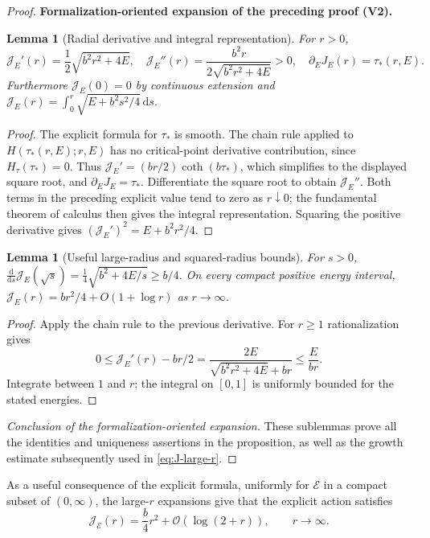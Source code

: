 \documentclass[11pt]{article}
\newtheorem{lemma}[theorem]{Lemma}
\newcommand{\formalisationparentid}{X}
\newenvironment{formalisationaddition}[1]{\par\medskip\begingroup\color{blue}\def\formalisationparentid{#1}\setcounter{formalizationsublemma}{0}\let\lemma\formalizationsublemma\let\endlemma\endformalizationsublemma
  \def\Eo{\mathcal E_h^\circ}\def\EE{\mathcal E_h}\def\phio{\phi_h^\circ}\def\phih{\phi_h}\def\Ho{H_h^{\rm atom}(v^\circ)}\def\Ha{H_h^{\rm atom}}\def\HL{H_h^{L}}\def\Dh{D_h}\def\Log{\operatorname{Log}}\def\ellh{\ell_h}\def\Gp{G_{p,h}}\def\Ast{A_{*,h}}\def\ahat{\widehat{\mathfrak a}_h}\def\ah{\mathfrak a_h}\def\rh{\widehat\rho_h}\def\deltah{\widehat\delta_h}\def\oldref##1{\textup{(##1)}}\def\interface##1{\par\noindent\textit{Analytical interface used here.} ##1\par}\def\finish{\par\noindent\textit{Conclusion of the formalization-oriented expansion.} }\par\noindent\textbf{Formalization-oriented expansion of the preceding proof (V2).}\par\smallskip
}{\par\endgroup\medskip
}
\newcommand{\cE}{\mathcal E}
\newcommand{\cJ}{\mathcal J}
\newcommand{\cO}{\mathcal O}
\begin{document}
\begin{proof}
\begin{formalisationaddition}{P2.2}
\begin{lemma}[Radial derivative and integral representation]\label{sublemma:P2-2-action-derivatives}
For $r>0$,
\[
 \cJ_E'(r)=\frac12\sqrt{b^2r^2+4E},\quad
 \cJ_E''(r)=\frac{b^2r}{2\sqrt{b^2r^2+4E}}>0,\quad
 \partial_EJ_E(r)=\tau_*(r,E).
\]
Furthermore $\cJ_E(0)=0$ by continuous extension and
$\cJ_E(r)=\int_0^r\sqrt{E+b^2s^2/4}\,\mathrm ds$.
\end{lemma}
\begin{proof}
The explicit formula for $\tau_*$ is smooth. The chain rule applied to $H(\tau_*(r,E);r,E)$ has no critical-point derivative contribution, since $H_\tau(\tau_*)=0$. Thus $\cJ_E'=(br/2)\coth(b\tau_*)$, which simplifies to the displayed square root, and $\partial_EJ_E=\tau_*$. Differentiate the square root to obtain $\cJ_E''$. Both terms in the preceding explicit value tend to zero as $r\downarrow0$; the fundamental theorem of calculus then gives the integral representation. Squaring the positive derivative gives $(\cJ_E')^2=E+b^2r^2/4$.
\end{proof}

\begin{lemma}[Useful large-radius and squared-radius bounds]\label{sublemma:P2-2-growth}
For $s>0$,
$\frac{\mathrm d}{\mathrm ds}\cJ_E(\sqrt s)=\frac14\sqrt{b^2+4E/s}\ge b/4$.
On every compact positive energy interval, $\cJ_E(r)=br^2/4+O(1+\log r)$ as $r\to\infty$.
\end{lemma}
\begin{proof}
Apply the chain rule to the previous derivative. For $r\ge1$ rationalization gives
\[
0\le \cJ_E'(r)-br/2
=\frac{2E}{\sqrt{b^2r^2+4E}+br}\le \frac{E}{br}.
\]
Integrate between $1$ and $r$; the integral on $[0,1]$ is uniformly bounded for the stated energies.
\end{proof}
\finish These sublemmas prove all the identities and uniqueness assertions in the proposition, as well as the growth estimate subsequently used in \eqref{eq:J-large-r}.
\end{formalisationaddition}

\end{proof}

As a useful consequence of the explicit formula, uniformly for $\cE$ in a compact subset of $(0,\infty)$, the large-$r$ expansions give that the explicit action satisfies
\begin{equation}\label{eq:J-large-r}
 \cJ_\cE(r)=\frac b4r^2+\cO(\log(2+r)),\qquad r\to\infty.
\end{equation}
\end{document}

